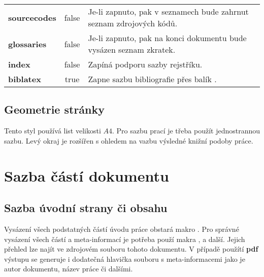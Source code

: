 \documentclass[
  biblatex,
  glossaries,
  index
]{kidiplom}
\begin{document}
\begin{table}
\begin{center}
{\begin{tabular}{>{\bfseries}l >{\ttfamily}c L{8cm}}
        sourcecodes            & false                         & Je-li zapnuto, pak v seznamech bude zahrnut seznam zdrojových kódů.                                                  \\

        glossaries             & false                         & Je-li zapnuto, pak na konci dokumentu bude vysázen seznam zkratek.                                                   \\

        index                  & false                         & Zapíná podporu sazby rejstříku.                                                                                      \\

        biblatex               & true                          & Zapne sazbu bibliografie přes balík \BibLaTeX{}.
      \end{tabular}}
  \end{center}
\end{table}

\subsection{Geometrie stránky}
Tento styl používá list velikosti $A4$. Pro sazbu prací je třeba použít jednostrannou sazbu. Levý okraj je rozšířen s ohledem na vazbu výsledné knižní podoby práce.









\section{Sazba částí dokumentu}
\subsection{Sazba úvodní strany či obsahu}
Vysázení všech podstatných částí úvodu práce obstará makro . Pro správné vysázení všech částí a meta-informací je potřeba použí makra ,  a další. Jejich přehled lze najít ve zdrojovém souboru tohoto dokumentu. V případě použítí \textbf{pdf} výstupu se generuje i dodatečná hlavička souboru s meta-informacemi jako je autor dokumentu, název práce či dalšími.
\end{document}

